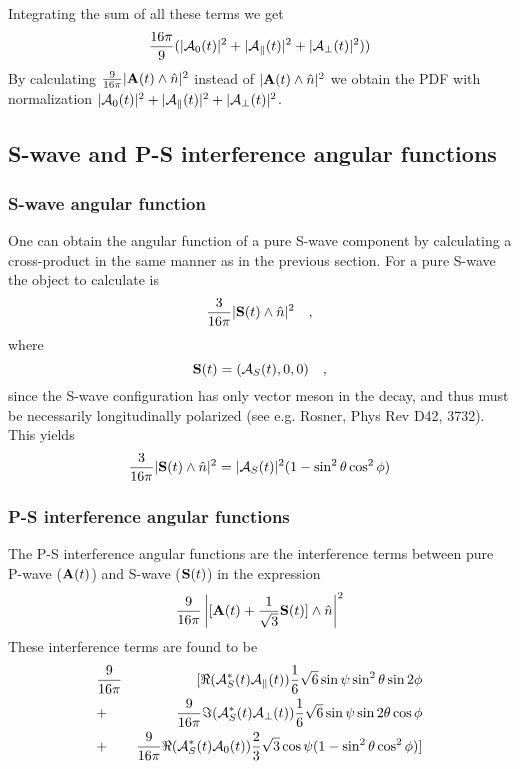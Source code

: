 \documentclass[a4paper,9pt,twosided]{article}
\begin{document}
Integrating the sum of all these terms we get
\begin{equation}
\frac{16\pi}{9}(|{\cal A}_{0}(t)|^{2}+|{\cal A}_{\parallel}(t)|^{2}+|{\cal A}_{\perp}(t)|^{2}))
\end{equation}
By calculating  $\frac{9}{16\pi}|{ \bf A}(t) \wedge \hat{n}|^2$ instead of $|{ \bf A}(t) \wedge \hat{n}|^2$ we obtain the PDF with normalization $|{\cal A}_{0}(t)|^{2}+|{\cal A}_{\parallel}(t)|^{2}+|{\cal A}_{\perp}(t)|^{2}$. 
\subsection{S-wave and P-S interference angular functions}\label{sec:Swaveangles}
\subsubsection{S-wave angular function}
One can obtain the angular function of a pure S-wave component by calculating a cross-product in the same manner as in the previous section. For a pure S-wave the object to calculate is
\begin{equation}
\frac{3}{16\pi}|{\bf S}(t) \wedge \hat{n}|^2\quad,
\end{equation}
where
\begin{equation}
{\bf S}(t) = ({\cal A}_{S}(t),0,0) \quad ,
\end{equation}
since the S-wave configuration has only vector meson in the decay, and thus must be necessarily longitudinally polarized (see e.g. Rosner, Phys Rev D42, 3732). This yields
\begin{equation}
\frac{3}{16\pi}|{\bf S}(t) \wedge \hat{n}|^{2}=|{\cal A}_{S}(t)|^2 (1-\sin^2\theta\cos^2\phi)
\end{equation}
\subsubsection{P-S interference angular functions}
The P-S interference angular functions are the interference terms between pure P-wave (${ \bf A}(t)$) and S-wave (${ \bf S}(t)$) in the expression
\begin{equation}
\frac{9}{16\pi}\left|[{ \bf A}(t) + \frac{1}{\sqrt{3}}{\bf S}(t)] \wedge \hat{n}\right|^2
\end{equation}
These interference terms are found to be
\begin{eqnarray}
&\frac{9}{16\pi}&[\Re({\cal{A}}_S^*(t){\cal{A}}_\parallel(t))\frac{1}{6}\sqrt{6}\sin\psi\sin^2\theta\sin 2\phi \\
&+&\frac{9}{16\pi}\Im({\cal{A}}_S^*(t){\cal{A}}_\perp(t))\frac{1}{6}\sqrt{6}\sin\psi\sin2\theta\cos\phi \\
&+&\frac{9}{16 \pi}\Re({\cal{A}}_S^*(t){\cal{A}}_0(t))\frac{2}{3}\sqrt{3}\cos\psi(1-\sin^2\theta\cos^2\phi)]
\end{eqnarray}
\end{document}
